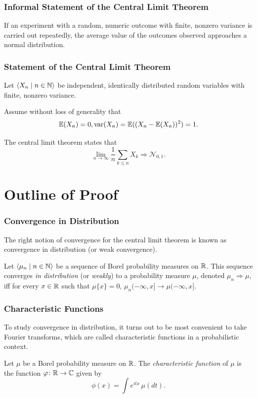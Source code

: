 \documentclass{beamer}
\newcommand\var{\mathop{\text{var}}}
\newcommand\bldseq[2]{\langle{#1}\mid{#2}\rangle}
\begin{document}
\begin{frame}
\frametitle{Informal Statement of the Central Limit Theorem}
If an experiment with a random, numeric outcome with finite, nonzero variance is carried out repeatedly, the average value of the outcomes observed approaches a normal distribution.
\end{frame}

\begin{frame}
\frametitle{Statement of the Central Limit Theorem}
Let $\bldseq{X_n}{n \in \N}$ be independent, identically distributed random variables with finite, nonzero variance. \pause

Assume without loss of generality that
\[ \E(X_n) = 0, \var(X_n) = \E((X_n - \E(X_n))^2) = 1. \] \pause

The central limit theorem states that
\[ \lim_{n \rightarrow \infty} \frac{1}{n}\sum_{k \le n} X_k \Rightarrow \mathcal N_{0,1}. \]
\end{frame}

\section{Outline of Proof}

\begin{frame}
\frametitle{Convergence in Distribution}
The right notion of convergence for the central limit theorem is known as convergence in distribution (or weak convergence). \pause
\begin{definition}
Let $\bldseq{\mu_n}{n \in \N}$ be a sequence of Borel probability measures on $\mathbb{R}$. This sequence converges {\em in distribution} (or {\em weakly}) to a probability measure $\mu$, denoted $\mu_n \Rightarrow \mu$, iff for every $x \in \mathbb{R}$ such that $\mu \{x\} = 0$, $\mu_n (-\infty, x] \rightarrow \mu (-\infty, x]$.
\end{definition}
\end{frame}

\begin{frame}
\frametitle{Characteristic Functions}
To study convergence in distribution, it turns out to be most convenient to take Fourier transforms, which are called characteristic functions in a probabilistic context. \pause

\begin{definition}
Let $\mu$ be a Borel probability measure on $\mathbb{R}$. The {\em characteristic function} of $\mu$ is the function $\varphi\colon \mathbb{R} \rightarrow \mathbb{C}$ given by
\[ \phi(x) = \int e^{itx} \, \mu(dt). \]
\end{definition}
\end{frame}
\end{document}
